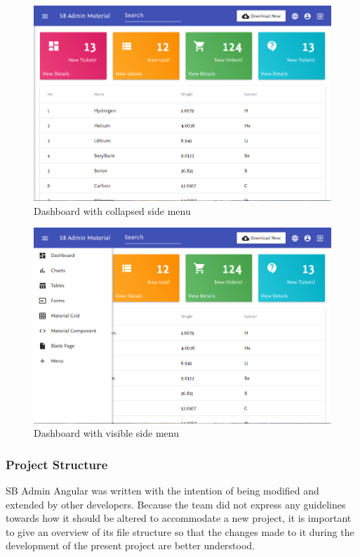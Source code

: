 \begin{figure}
  \centering
  \includegraphics[width=.8\textwidth]{images/sbadmin/collapsed}
  \caption{Dashboard with collapsed side menu}\label{fig:dash}
\end{figure}

\begin{figure}
  \centering
  \includegraphics[width=.8\textwidth]{images/sbadmin/visible}
  \caption{Dashboard with visible side menu}\label{fig:visible}
\end{figure}

\subsubsection{Project Structure}
SB Admin Angular was written with the intention of being modified and extended by other developers. Because the team did not express any guidelines towards how it should be altered to accommodate a new project, it is important to give an overview of its file structure so that the changes made to it during the development of the present project are better understood.

